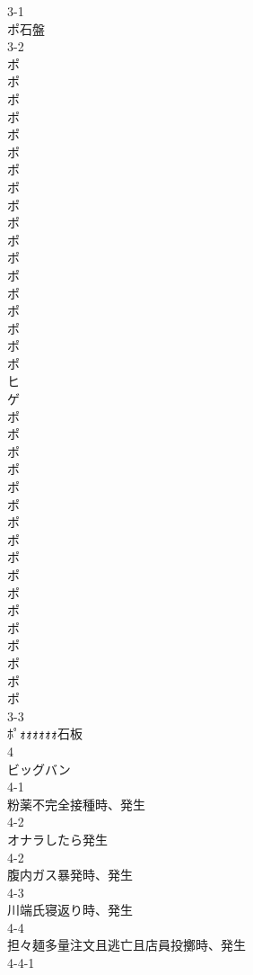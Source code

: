 3-1\\
ポ石盤\\
3-2\\
ポ\\
ポ\\
ポ\\
ポ\\
ポ\\
ポ\\
ポ\\
ポ\\
ポ\\
ポ\\
ポ\\
ポ\\
ポ\\
ポ\\
ポ\\
ポ\\
ポ\\
ポ\\
ヒ\\
ゲ\\
ポ\\
ポ\\
ポ\\
ポ\\
ポ\\
ポ\\
ポ\\
ポ\\
ポ\\
ポ\\
ポ\\
ポ\\
ポ\\
ポ\\
ポ\\
ポ\\
ポ\\
3-3\\
ﾎﾟｫｫｫｫｫｫ石板\\
4\\
ビッグバン\\
4-1\\
粉薬不完全接種時、発生\\
4-2\\
オナラしたら発生\\
4-2\\
腹内ガス暴発時、発生\\
4-3\\
川端氏寝返り時、発生\\
4-4\\
担々麺多量注文且逃亡且店員投擲時、発生\\
4-4-1\\
